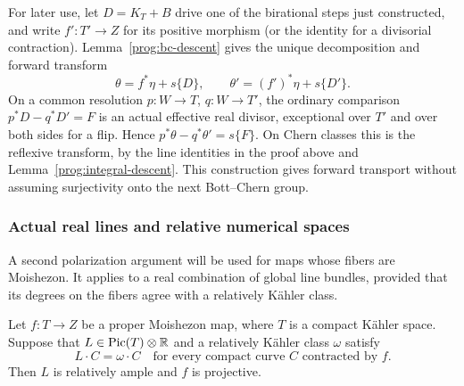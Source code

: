 For later use, let \(D=K_T+B\) drive one of the birational steps just
constructed, and write \(f':T'\to Z\) for its positive morphism
(or the identity for a divisorial contraction). Lemma~\ref{prog:bc-descent}
gives the unique decomposition and forward transform
\begin{equation}
 \theta=f^*\eta+s\{D\},\qquad
 \theta'=(f')^*\eta+s\{D'\}.
 \label{prog:ordinary-forward-transport}
\end{equation}
On a common resolution \(p:W\to T\), \(q:W\to T'\), the ordinary
comparison \(p^*D-q^*D'=F\) is an actual effective real divisor,
exceptional over \(T'\) and over both sides for a flip. Hence
\(p^*\theta-q^*\theta'=s\{F\}\). On Chern classes this is the
reflexive transform, by the line identities in the proof above and
Lemma~\ref{prog:integral-descent}. This construction gives forward
transport without assuming surjectivity onto the next Bott--Chern group.

\subsubsection{Actual real lines and relative numerical spaces}

A second polarization argument will be used for maps whose fibers are
Moishezon. It applies to a real combination of global line bundles,
provided that its degrees on the fibers agree with a relatively Kähler
class.

\begin{lemma}
\label{prog:actual-line-polarization}
Let $f:T\to Z$ be a proper Moishezon map, where $T$ is a compact
K\"ahler space. Suppose that $L\in\operatorname{Pic}(T)\otimes\mathbb R$
and a relatively K\"ahler class $\omega$ satisfy
\[
 L\cdot C=\omega\cdot C
 \quad\text{for every compact curve $C$ contracted by $f$.}
\]
Then $L$ is relatively ample and $f$ is projective.
\end{lemma}

